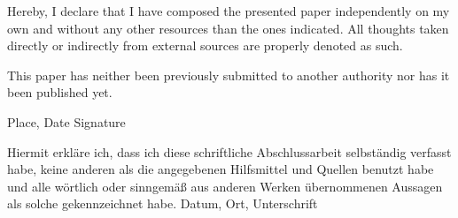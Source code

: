 \documentclass[12pt,a4paper,twoside]{report}
\begin{document}
Hereby, I declare that I have composed the presented paper independently on my own and without any other resources than the ones indicated. All thoughts taken directly or indirectly from external sources are properly denoted as such.

This paper has neither been previously submitted to another authority nor has it been published yet.
\vskip 3cm

Place, Date	\hfill Signature \hfill

Hiermit erkläre ich, dass ich diese schriftliche Abschlussarbeit selbständig verfasst habe,
keine anderen als die angegebenen Hilfsmittel und Quellen benutzt habe und alle wörtlich
oder sinngemäß aus anderen Werken übernommenen Aussagen als solche gekennzeichnet
habe.
Datum, Ort, \hfill Unterschrift \hfill

\newpage

\renewcommand{\baselinestretch}{1.3}
\small\normalsize

\tableofcontents

\renewcommand{\baselinestretch}{1}
\small\normalsize

\newpage
\null
\thispagestyle{empty}
\newpage %


\setcounter{page}{1}


\newpage


\newpage


\newpage


\newpage


\newpage


\newpage
\end{document}
